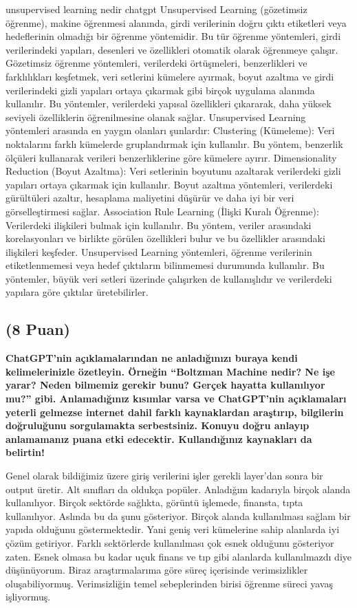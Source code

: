 \documentclass[11pt]{article}
\begin{document}
unsupervised learning nedir chatgpt
Unsupervised Learning (gözetimsiz öğrenme), makine öğrenmesi alanında, girdi verilerinin doğru çıktı etiketleri veya hedeflerinin olmadığı bir öğrenme yöntemidir. Bu tür öğrenme yöntemleri, girdi verilerindeki yapıları, desenleri ve özellikleri otomatik olarak öğrenmeye çalışır.
Gözetimsiz öğrenme yöntemleri, verilerdeki örtüşmeleri, benzerlikleri ve farklılıkları keşfetmek, veri setlerini kümelere ayırmak, boyut azaltma ve girdi verilerindeki gizli yapıları ortaya çıkarmak gibi birçok uygulama alanında kullanılır. Bu yöntemler, verilerdeki yapısal özellikleri çıkararak, daha yüksek seviyeli özelliklerin öğrenilmesine olanak sağlar.
Unsupervised Learning yöntemleri arasında en yaygın olanları şunlardır:
Clustering (Kümeleme): Veri noktalarını farklı kümelerde gruplandırmak için kullanılır. Bu yöntem, benzerlik ölçüleri kullanarak verileri benzerliklerine göre kümelere ayırır.
Dimensionality Reduction (Boyut Azaltma): Veri setlerinin boyutunu azaltarak verilerdeki gizli yapıları ortaya çıkarmak için kullanılır. Boyut azaltma yöntemleri, verilerdeki gürültüleri azaltır, hesaplama maliyetini düşürür ve daha iyi bir veri görselleştirmesi sağlar.
Association Rule Learning (İlişki Kuralı Öğrenme): Verilerdeki ilişkileri bulmak için kullanılır. Bu yöntem, veriler arasındaki korelasyonları ve birlikte görülen özellikleri bulur ve bu özellikler arasındaki ilişkileri keşfeder.
Unsupervised Learning yöntemleri, öğrenme verilerinin etiketlenmemesi veya hedef çıktıların bilinmemesi durumunda kullanılır. Bu yöntemler, büyük veri setleri üzerinde çalışırken de kullanışlıdır ve verilerdeki yapılara göre çıktılar üretebilirler.

\subsection{(8 Puan)} \textbf{ChatGPT’nin açıklamalarından ne anladığınızı buraya kendi kelimelerinizle özetleyin. Örneğin ``Boltzman Machine nedir? Ne işe yarar? Neden bilmemiz gerekir bunu? Gerçek hayatta kullanılıyor mu?'' gibi. Anlamadığınız kısımlar varsa ve ChatGPT’nin açıklamaları yeterli gelmezse internet dahil farklı kaynaklardan araştırıp, bilgilerin doğruluğunu sorgulamakta serbestsiniz. Konuyu doğru anlayıp anlamamanız puana etki edecektir. Kullandığınız kaynakları da belirtin!}

Genel olarak bildiğimiz üzere giriş verilerini işler gerekli layer'dan sonra bir output üretir. Alt sınıfları da oldukça popüler. Anladığım kadarıyla birçok alanda kullanılıyor. Birçok sektörde sağlıkta, görüntü işlemede,
finansta, tıpta kullanılıyor. Aslında bu da şunu gösteriyor. Birçok alanda kullanılması sağlam bir yapıda olduğunu göstermektedir. Yani geniş veri kümelerine sahip alanlarda iyi çözüm getiriyor.
Farklı sektörlerde kullanılması çok esnek olduğunu gösteriyor zaten. Esnek olmasa bu kadar uçuk finans ve tıp gibi alanlarda kullanılmazdı diye düşünüyorum.
Biraz araştırmalarıma göre süreç içerisinde verimsizlikler oluşabiliyormuş. Verimsizliğin temel sebeplerinden birisi öğrenme süreci yavaş işliyormuş.
\end{document}
